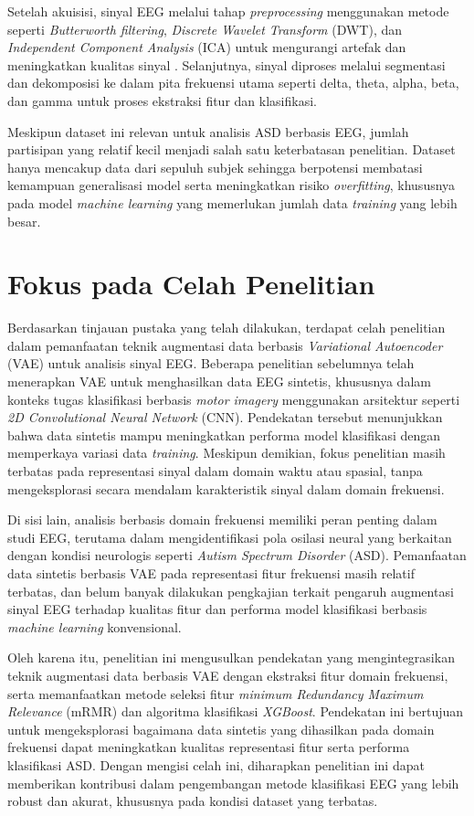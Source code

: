 Setelah akuisisi, sinyal EEG melalui tahap \textit{preprocessing} menggunakan metode seperti \textit{Butterworth filtering}, \textit{Discrete Wavelet Transform} (DWT), dan \textit{Independent Component Analysis} (ICA) untuk mengurangi artefak dan meningkatkan kualitas sinyal \cite{paper_ref}. Selanjutnya, sinyal diproses melalui segmentasi dan dekomposisi ke dalam pita frekuensi utama seperti delta, theta, alpha, beta, dan gamma untuk proses ekstraksi fitur dan klasifikasi.

Meskipun dataset ini relevan untuk analisis ASD berbasis EEG, jumlah partisipan yang relatif kecil menjadi salah satu keterbatasan penelitian. Dataset hanya mencakup data dari sepuluh subjek sehingga berpotensi membatasi kemampuan generalisasi model serta meningkatkan risiko \textit{overfitting}, khususnya pada model \textit{machine learning} yang memerlukan jumlah data \textit{training} yang lebih besar.

\section{Fokus pada Celah Penelitian}
\label{Fokus pada Celah Penelitian}

Berdasarkan tinjauan pustaka yang telah dilakukan, terdapat celah penelitian dalam pemanfaatan teknik augmentasi data berbasis \textit{Variational Autoencoder} (VAE) untuk analisis sinyal EEG. Beberapa penelitian sebelumnya telah menerapkan VAE untuk menghasilkan data EEG sintetis, khususnya dalam konteks tugas klasifikasi berbasis \textit{motor imagery} menggunakan arsitektur seperti \textit{2D Convolutional Neural Network} (CNN). Pendekatan tersebut menunjukkan bahwa data sintetis mampu meningkatkan performa model klasifikasi dengan memperkaya variasi data \textit{training}. Meskipun demikian, fokus penelitian masih terbatas pada representasi sinyal dalam domain waktu atau spasial, tanpa mengeksplorasi secara mendalam karakteristik sinyal dalam domain frekuensi.

Di sisi lain, analisis berbasis domain frekuensi memiliki peran penting dalam studi EEG, terutama dalam mengidentifikasi pola osilasi neural yang berkaitan dengan kondisi neurologis seperti \textit{Autism Spectrum Disorder} (ASD). Pemanfaatan data sintetis berbasis VAE pada representasi fitur frekuensi masih relatif terbatas, dan belum banyak dilakukan pengkajian terkait pengaruh augmentasi sinyal EEG terhadap kualitas fitur dan performa model klasifikasi berbasis \textit{machine learning} konvensional.

Oleh karena itu, penelitian ini mengusulkan pendekatan yang mengintegrasikan teknik augmentasi data berbasis VAE dengan ekstraksi fitur domain frekuensi, serta memanfaatkan metode seleksi fitur \textit{minimum Redundancy Maximum Relevance} (mRMR) dan algoritma klasifikasi \textit{XGBoost}. Pendekatan ini bertujuan untuk mengeksplorasi bagaimana data sintetis yang dihasilkan pada domain frekuensi dapat meningkatkan kualitas representasi fitur serta performa klasifikasi ASD. Dengan mengisi celah ini, diharapkan penelitian ini dapat memberikan kontribusi dalam pengembangan metode klasifikasi EEG yang lebih robust dan akurat, khususnya pada kondisi dataset yang terbatas.

